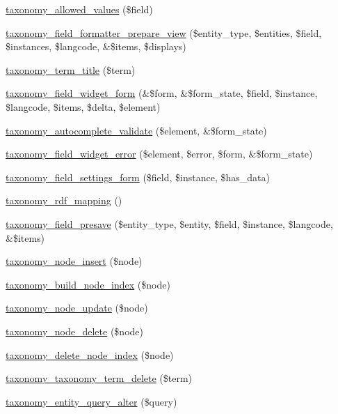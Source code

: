 \begin{DoxyCompactItemize}
\item 
\hyperlink{taxonomy_8module_ae0381bf0e025fac9d606887241c3c8f9}{taxonomy\_\-allowed\_\-values} (\$field)
\item 
\hyperlink{taxonomy_8module_aee141dcf114b33893f92d174fe53a896}{taxonomy\_\-field\_\-formatter\_\-prepare\_\-view} (\$entity\_\-type, \$entities, \$field, \$instances, \$langcode, \&\$items, \$displays)
\item 
\hyperlink{taxonomy_8module_ac694b38220012b458a4beaa70a66abe3}{taxonomy\_\-term\_\-title} (\$term)
\item 
\hyperlink{taxonomy_8module_a05c9187ec859f3b715af290fec4d77db}{taxonomy\_\-field\_\-widget\_\-form} (\&\$form, \&\$form\_\-state, \$field, \$instance, \$langcode, \$items, \$delta, \$element)
\item 
\hyperlink{taxonomy_8module_a424a1d85875dc55781d8f0e840fae87e}{taxonomy\_\-autocomplete\_\-validate} (\$element, \&\$form\_\-state)
\item 
\hyperlink{taxonomy_8module_af0c0026c27179a8e8f4b933b85cda307}{taxonomy\_\-field\_\-widget\_\-error} (\$element, \$error, \$form, \&\$form\_\-state)
\item 
\hyperlink{taxonomy_8module_a41b526275b013140cd47e59bb0a36e88}{taxonomy\_\-field\_\-settings\_\-form} (\$field, \$instance, \$has\_\-data)
\item 
\hyperlink{taxonomy_8module_a319b54e0e77df84f22c4a61fca2d93e5}{taxonomy\_\-rdf\_\-mapping} ()
\item 
\hyperlink{group__taxonomy__index_ga153d69020ee8a88cd17e1836b184972a}{taxonomy\_\-field\_\-presave} (\$entity\_\-type, \$entity, \$field, \$instance, \$langcode, \&\$items)
\item 
\hyperlink{group__taxonomy__index_ga48e783c30c362615a8747a02e49c8c32}{taxonomy\_\-node\_\-insert} (\$node)
\item 
\hyperlink{group__taxonomy__index_ga3ace4aed11277879b4c85d0ee8001fdc}{taxonomy\_\-build\_\-node\_\-index} (\$node)
\item 
\hyperlink{group__taxonomy__index_gac6d5a5135886afdfe870c657df502908}{taxonomy\_\-node\_\-update} (\$node)
\item 
\hyperlink{group__taxonomy__index_gae47bb910cad247043b7ce8fda691ef74}{taxonomy\_\-node\_\-delete} (\$node)
\item 
\hyperlink{group__taxonomy__index_ga5c48fc5228e67a255b15133e218ad1e9}{taxonomy\_\-delete\_\-node\_\-index} (\$node)
\item 
\hyperlink{group__taxonomy__index_ga560abdef7f1cccbd2eb55f6ae78ac10e}{taxonomy\_\-taxonomy\_\-term\_\-delete} (\$term)
\item 
\hyperlink{taxonomy_8module_af966cf19abfe4bab47657aba9e494bc3}{taxonomy\_\-entity\_\-query\_\-alter} (\$query)
\end{DoxyCompactItemize}


